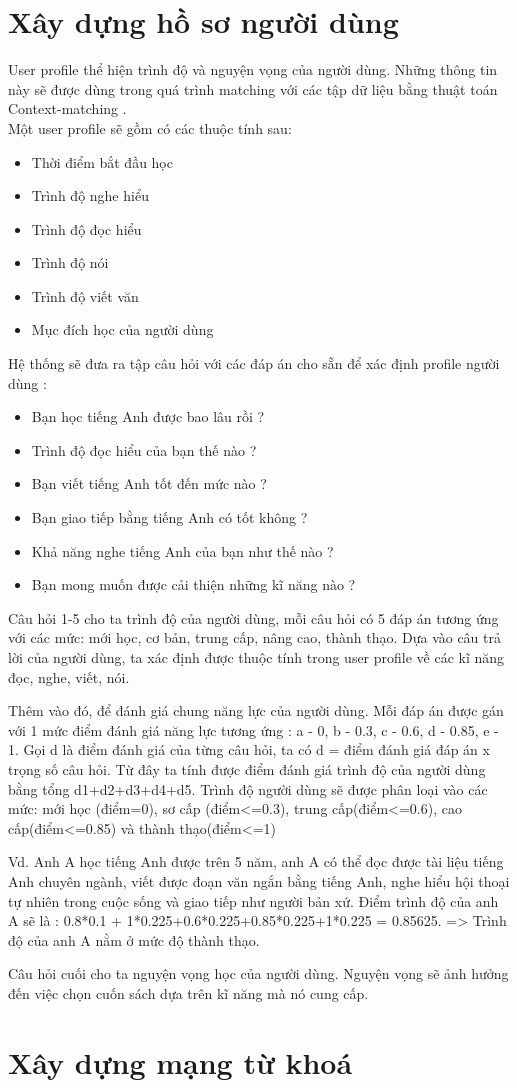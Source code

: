 \section{Xây dựng hồ sơ người dùng}
User profile thể hiện trình độ và nguyện vọng của người dùng. Những thông tin này sẽ được dùng trong quá trình matching với các tập dữ liệu bằng thuật toán Context-matching . \\
Một user profile sẽ gồm có các thuộc tính sau:
\begin{itemize}
\item Thời điểm bắt đầu học
\item Trình độ nghe hiểu
\item Trình độ đọc hiểu
\item Trình độ nói
\item Trình độ viết văn
\item Mục đích học của người dùng\\
\end{itemize}
Hệ thống sẽ đưa ra tập câu hỏi với các đáp án cho sẵn để xác định profile người dùng :
\begin{itemize}
\item Bạn học tiếng Anh được bao lâu rồi ?
\item Trình độ đọc hiểu của bạn thế nào ?
\item Bạn viết tiếng Anh tốt đến mức nào ?
\item Bạn giao tiếp bằng tiếng Anh có tốt không ?
\item Khả năng nghe tiếng Anh của bạn như thế nào ?
\item Bạn mong muốn được cải thiện những kĩ năng nào ?	
\end{itemize}

Câu hỏi 1-5 cho ta trình độ của người dùng, mỗi câu hỏi có 5 đáp án tương ứng với các mức: mới học, cơ bản, trung cấp, nâng cao, thành thạo. Dựa vào câu trả lời của người dùng, ta xác định được thuộc tính trong user profile về các kĩ năng đọc, nghe, viết, nói.

Thêm vào đó, để đánh giá chung năng lực của người dùng. Mỗi đáp án được gán với 1 mức điểm đánh giá năng lực tương ứng : a - 0, b - 0.3, c - 0.6, d - 0.85, e - 1. Gọi d là điểm đánh giá của từng câu hỏi, ta có d = điểm đánh giá đáp án x trọng số câu hỏi. Từ đây ta tính được điểm đánh giá trình độ của người dùng bằng tổng d1+d2+d3+d4+d5. Trình độ người dùng sẽ được phân loại vào các mức: mới học (điểm=0), sơ cấp (điểm<=0.3), trung cấp(điểm<=0.6), cao cấp(điểm<=0.85) và thành thạo(điểm<=1)

Vd. Anh A học tiếng Anh được trên 5 năm, anh A có thể đọc được tài liệu tiếng Anh chuyên ngành, viết được đoạn văn ngắn bằng tiếng Anh, nghe hiểu hội thoại tự nhiên trong cuộc sống và giao tiếp như người bản xứ. Điểm trình độ của anh A sẽ là : 0.8*0.1 + 1*0.225+0.6*0.225+0.85*0.225+1*0.225 = 0.85625. => Trình độ của anh A nằm ở mức độ thành thạo.

Câu hỏi cuối cho ta nguyện vọng học của người dùng. Nguyện vọng sẽ ảnh hưởng đến việc chọn cuốn sách dựa trên kĩ năng mà nó cung cấp.
\section{Xây dựng mạng từ khoá}


